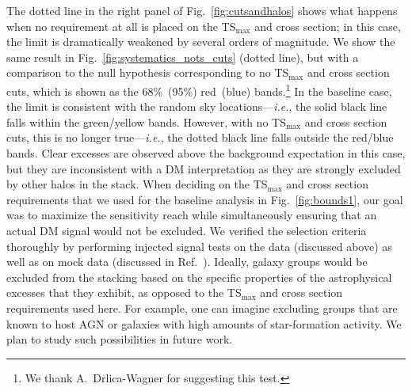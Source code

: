 The dotted line in the right panel of Fig.~\ref{fig:cutsandhalos} shows  what happens when no requirement at all is placed on the TS$_\text{max}$ and cross section; in this case, the limit is dramatically weakened by several orders of magnitude.   We show the same result in Fig.~\ref{fig:systematics_nots_cuts} (dotted line), but with a comparison to the null hypothesis corresponding to no TS$_\text{max}$ and cross section cuts, which is shown as the 68\%~(95\%) red~(blue) bands.\footnote{We thank A.~Drlica-Wagner for suggesting this test.}    In the baseline case, the limit is consistent with the random sky locations---\emph{i.e.}, the solid black line falls within the green/yellow bands.  However, with no TS$_\text{max}$ and cross section cuts, this is no longer true---\emph{i.e.}, the dotted black line falls outside the red/blue bands.  Clear excesses are observed above the background expectation in this case, but they are inconsistent with a DM interpretation as they are strongly excluded by other halos in the stack.  When deciding on the TS$_\text{max}$ and cross section requirements that we used for the baseline analysis in Fig.~\ref{fig:bounds1}, our goal was to maximize the sensitivity reach while simultaneously ensuring that an actual DM signal would not be excluded.  We verified the selection criteria thoroughly by performing injected signal tests on the data (discussed above) as well as on mock data (discussed in Ref.~\cite{companion}).  Ideally, galaxy groups would be excluded from the stacking based on the specific properties of the astrophysical excesses that they exhibit, as opposed to the TS$_\text{max}$ and cross section requirements used here.  For example, one can imagine excluding groups that are known to host  AGN or galaxies with high amounts of star-formation activity.  We plan to study such possibilities in future work.        \vspace{0.1in}

